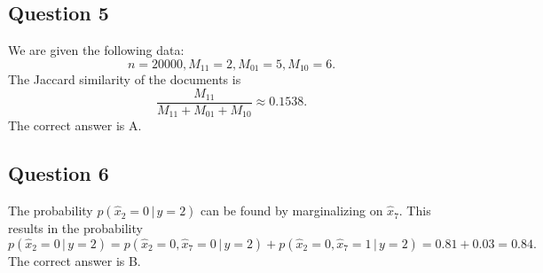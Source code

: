 \documentclass[twoside,11pt]{article}
\begin{document}
\subsection*{Question 5}

We are given the following data:
\[
	n = 20000, M_{11} = 2, M_{01} = 5, M_{10} = 6.
\]
The Jaccard similarity of the documents is
\[
	\frac{M_{11}}{M_{11} + M_{01} + M_{10}} \approx 0.1538.
\]
The correct answer is A.

\subsection*{Question 6}

The probability \(p(\hat{x}_2 = 0 \, | \, y = 2)\) can be found by marginalizing on \(\hat{x}_7\). This results in the probability
\[
	p(\hat{x}_2 = 0 \, | \, y = 2) = p(\hat{x}_2 = 0, \hat{x}_7 = 0 \, | \, y = 2)
	+ p(\hat{x}_2 = 0, \hat{x}_7 = 1 \, | \, y = 2) = 0.81 + 0.03 = 0.84.
\]
The correct answer is B.
\end{document}
